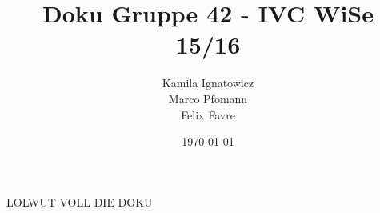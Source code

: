 \documentclass[paper=a4]{scrartcl}
\begin{document}
  \title{Doku Gruppe 42 - IVC WiSe 15/16}
  \author{Kamila Ignatowicz\\ Marco Pfomann \\ Felix Favre}
  \date{\today}
  \maketitle

LOLWUT VOLL DIE DOKU
\end{document}
